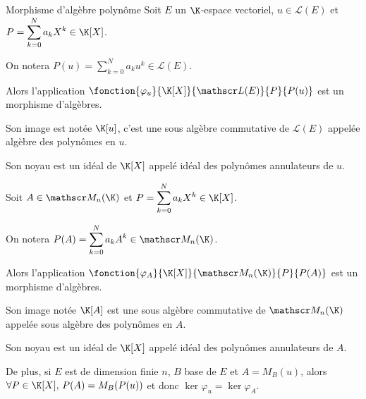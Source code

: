 \begin{theoreme}{Morphisme d'algèbre polynôme}{}
    Soit $E$ un $\K$-espace vectoriel, $u \in \mathscr L(E)$ et 
    $P = \displaystyle \sum_{k = 0 }^{ N } a_k X^k \in \K[X]$.

    On notera $P(u) = \displaystyle \sum_{k = 0 }^{ N } a_k u^k \in \mathscr L(E)$.

    Alors l'application $\fonction{\varphi_u}{\K[X]}{\mathscr L(E)}{P}{P(u)}$ est un morphisme d'algèbres.

    Son image est notée $\K[u]$, c'est une sous algèbre commutative de $\mathscr L(E)$
    appelée algèbre des polynômes en $u$.

    Son noyau est un idéal de $\K[X]$ appelé idéal des polynômes annulateurs de $u$.

    \lvspace Soit $A \in \mathscr M_n(\K)$ et $P = \displaystyle \sum_{k = 0 }^{ N } a_k X^k \in \K[X]$.

    On notera $P(A) = \displaystyle \sum_{k = 0 }^{ N } a_k A^k \in \mathscr M_n(\K)$.

    Alors l'application $\fonction{\varphi_A}{\K[X]}{\mathscr M_n(\K)}{P}{P(A)}$ est un morphisme d'algèbres.

    Son image notée $\K[A]$ est une sous algèbre commutative de $\mathscr M_n(\K)$ appelée 
    sous algèbre des polynômes en $A$.

    Son noyau est un idéal de $\K[X]$ appelé idéal des polynômes annulateurs de $A$.

    De plus, si $E$ est de dimension finie $n$, $B$ base de $E$ et $A = M_B(u)$, alors
    $\forall P \in \K[X], \, P(A) = M_B(P(u))$ et donc $\ker \varphi_u = \ker \varphi_A$.
\end{theoreme}

